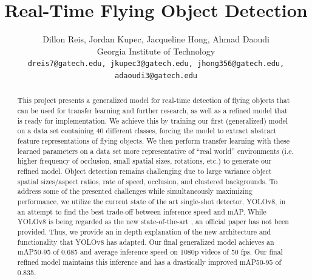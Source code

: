 \documentclass[10pt,twocolumn,letterpaper]{article}
\begin{document}
\title{Real-Time Flying Object Detection}

\author{Dillon Reis, Jordan Kupec, Jacqueline Hong, Ahmad Daoudi\\
Georgia Institute of Technology\\
{\tt\small dreis7@gatech.edu, jkupec3@gatech.edu, jhong356@gatech.edu, adaoudi3@gatech.edu}
}

\maketitle

\begin{abstract}
This project presents a generalized model for real-time detection of flying objects that can be used for transfer learning and further research, as well as a refined model that is ready for implementation. We achieve this by training our first (generalized) model on a data set containing 40 different classes, forcing the model to extract abstract feature representations of flying objects. We then perform transfer learning with these learned parameters on a data set more representative of ``real world” environments (i.e. higher frequency of occlusion, small spatial sizes, rotations, etc.) to generate our refined model. Object detection remains challenging due to large variance object spatial sizes/aspect ratios, rate of speed, occlusion, and clustered backgrounds. To address some of the presented challenges while simultaneously maximizing performance, we utilize the current state of the art single-shot detector, YOLOv8, in an attempt to find the best trade-off between inference speed and mAP. While YOLOv8 is being regarded as the new state-of-the-art \cite{YOLOv8Website}, an official paper has not been provided. Thus, we provide an in depth explanation of the new architecture and functionality that YOLOv8 has adapted. Our final generalized model achieves an mAP50-95 of 0.685 and average inference speed on 1080p videos of 50 fps. Our final refined model maintains this inference and has a drastically improved mAP50-95 of 0.835.  
\end{abstract}
\end{document}
